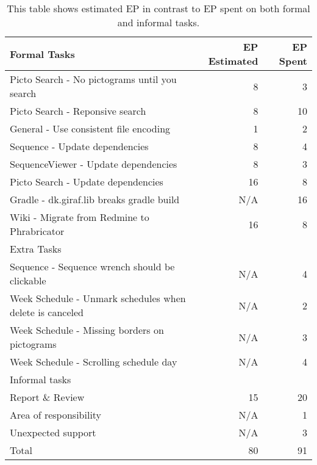 \begin{table}[h]
    {\setlength{\extrarowheight}{1ex}%
    \begin{tabularx}{\textwidth}{X|r|r}
        \toprule
        Formal Tasks                                                  & EP Estimated & EP Spent     \\
        \midrule
        Picto Search - No pictograms until you search                 & 8            & 3            \\
        Picto Search - Reponsive search                               & 8            & 10           \\
        General - Use consistent file encoding                        & 1            & 2            \\
        Sequence - Update dependencies                                & 8            & 4            \\
        SequenceViewer - Update dependencies                          & 8            & 3            \\
        Picto Search - Update dependencies                            & 16           & 8            \\
        Gradle - dk.giraf.lib breaks gradle build                     & N/A          & 16           \\
        Wiki - Migrate from Redmine to Phrabricator                   & 16           & 8            \\
        \toprule
        Extra Tasks                                                   &              &              \\
        \midrule
        Sequence - Sequence wrench should be clickable                & N/A          & 4            \\
        Week Schedule - Unmark schedules when delete is canceled      & N/A          & 2            \\
        Week Schedule - Missing borders on pictograms                 & N/A          & 3            \\
        Week Schedule - Scrolling schedule day                        & N/A          & 4            \\
        \toprule
        Informal tasks                                                &              &              \\
        \midrule
        Report \& Review                                              & 15           & 20           \\      %
        Area of responsibility                                        & N/A          & 1            \\
        Unexpected support                                            & N/A          & 3            \\
        \midrule
        Total                                                         & 80           & 91           \\
        \bottomrule
    \end{tabularx}}
    \caption{This table shows estimated EP in contrast to EP spent on both formal and informal tasks.}
    \label{tab:sprint1tasktable}
\end{table}
